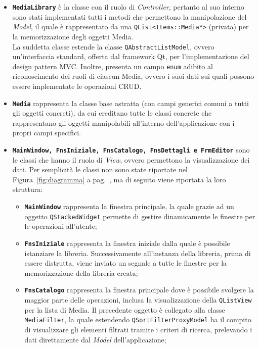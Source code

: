 \documentclass[a4paper,10pt]{article}
\begin{document}
	\begin{itemize}
		\item \textbf{\texttt{MediaLibrary}} è la classe con il ruolo di \textit{Controller}, pertanto al suo interno sono stati implementati tutti i metodi che permettono la manipolazione del \textit{Model}, il quale è rappresentato da una \texttt{QList<Items::Media*>} (privata) per la memorizzazione degli oggetti Media.\\
		La suddetta classe estende la classe \texttt{QAbstractListModel}, ovvero un'interfaccia standard, offerta dal framework Qt, per l'implementazione del design pattern MVC. Inoltre, presenta un campo \texttt{enum} adibito al riconoscimento dei ruoli di ciascun Media, ovvero i suoi dati sui quali possono essere implementate le operazioni CRUD.
		\item \textbf{\texttt{Media}} rappresenta la classe base astratta (con campi generici comuni a tutti gli oggetti concreti), da cui ereditano tutte le classi concrete che rappresentano gli oggetti manipolabili all'interno dell'applicazione con i propri campi specifici.\\
		\item \textbf{\texttt{MainWindow, FnsIniziale, FnsCatalogo, FnsDettagli e FrmEditor}} sono le classi che hanno il ruolo di \textit{View}, ovvero permettono la visualizzazione dei dati. Per semplicità le classi non sono state riportate nel Figura~\ref{fig:diagramma} a pag.~\pageref{fig:diagramma}, ma di seguito viene riportata la loro struttura:
		\begin{itemize}
			\item \textbf{\texttt{MainWindow}} rappresenta la finestra principale, la quale grazie ad un oggetto \texttt{QStackedWidget} permette di gestire dinamicamente le finestre per le operazioni all'utente;
			\item \textbf{\texttt{FnsIniziale}} rappresenta la finestra iniziale dalla quale è possibile istanziare la libreria. Successivamente all'instanza della libreria, prima di essere distrutta, viene inviato un segnale a tutte le finestre per la memorizzazione della libreria creata;
			\item \textbf{\texttt{FnsCatalogo}} rappresenta la finestra principale dove è possibile svolgere la maggior parte delle operazioni, inclusa la visualizzazione della \texttt{QListView} per la lista di Media. Il precedente oggetto è collegato alla classe \texttt{MediaFilter}, la quale estendendo \texttt{QSortFilterProxyModel} ha il compito di visualizzare gli elementi filtrati tramite i criteri di ricerca, prelevando i dati direttamente dal \textit{Model} dell'applicazione;

\end{itemize}
\end{itemize}
\end{document}

